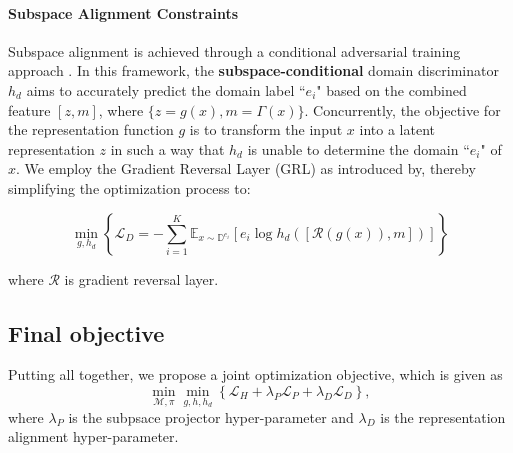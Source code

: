\paragraph{Subspace Alignment Constraints}
Subspace alignment is achieved through a conditional adversarial training approach \cite{gan2016learning, li2018domain}. In this framework, the \textbf{subspace-conditional} domain discriminator $h_d$ aims to accurately predict the domain label ``$e_i$" based on the combined feature $[z,m]$, where $\{z=g(x), m=\Gamma(x)\}$. Concurrently, the objective for the representation function $g$ is to transform the input $x$ into a latent representation $z$ in such a way that $h_d$ is unable to determine the domain ``$e_i$" of $x$.  We employ the Gradient Reversal Layer (GRL) as introduced by\cite{ganin2016domain}, thereby simplifying the optimization process to:

\begin{equation}
    \min_{g, h_d} \left \{\mathcal{L}_{D}=-\sum_{i=1}^K\mathbb{E}_{x\sim\mathbb{D}^{e_i}}\left [ e_i\log h_d\left (\left [ \mathcal{R}\left ( g(x) \right ),m \right ]\right ) \right ] \right \}
\end{equation}

where $\mathcal{R}$ is gradient reversal layer.


\subsection*{Final objective}
Putting all together, we propose a joint optimization objective, which is given as  
\begin{equation}
\min_{\mathcal{M},\pi} \min_{g,h, h_d}  \left \{\mathcal{L}_{H}+\lambda_P\mathcal{L}_{P}+\lambda_D \mathcal{L}_{D}\right \},
\end{equation}
where $ \lambda_P$ is the subpsace projector hyper-parameter and $\lambda_D$ is the representation alignment hyper-parameter. 




